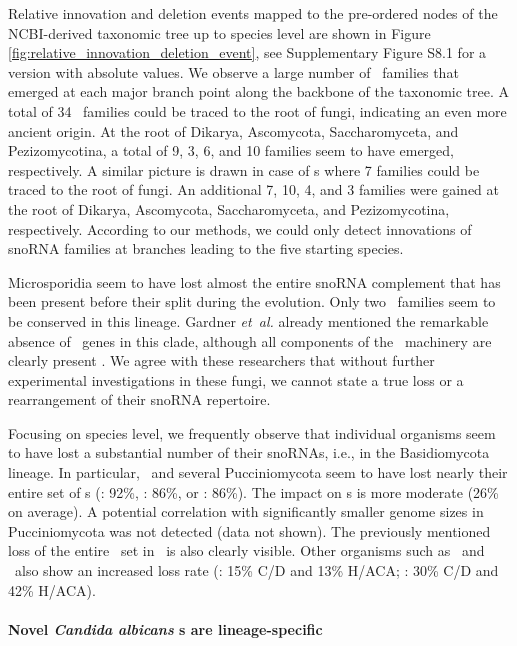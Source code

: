 Relative innovation and deletion events mapped to the pre-ordered nodes of
the NCBI-derived taxonomic tree up to species level are shown in Figure
\ref{fig:relative_innovation_deletion_event}, see Supplementary Figure S8.1
for a version with absolute values.  We observe a large number of \sno\
families that emerged at each major branch point along the backbone of the
taxonomic tree. A total of 34 \cd\ families could be traced to the root of
fungi, indicating an even more ancient origin. At the root of Dikarya,
Ascomycota, Saccharomyceta, and Pezizomycotina, a total of 9, 3, 6, and 10
families seem to have emerged, respectively. A similar picture is drawn in case of \haca s
where 7 families could be traced to the root of fungi. An additional 7, 10,
4, and 3 families were gained at the root of Dikarya, Ascomycota,
Saccharomyceta, and Pezizomycotina, respectively.  According to our
methods, we could only detect innovations of snoRNA families at branches
leading to the five starting species.

Microsporidia seem to have lost almost the entire snoRNA complement that
has been present before their split during the evolution.  Only two \cd\
families seem to be conserved in this lineage.  Gardner \emph{et~al.}
already mentioned the remarkable absence of \sno\ genes in this clade,
although all components of the \sno\ machinery are clearly present
\cite{Gardner:2010}.  We agree with these researchers that without further
experimental investigations in these fungi, we cannot state a true loss or
a rearrangement of their snoRNA repertoire.

Focusing on species level, we frequently observe that individual organisms
seem to have lost a substantial number of their snoRNAs, i.e., in the
Basidiomycota lineage.  In particular, \wse\ and several Pucciniomycota
seem to have lost nearly their entire set of \haca s (\wse: 92\%, \rmi:
86\%, or \sli: 86\%). The impact on \cd s is more moderate (26\% on
average). A potential correlation with significantly smaller genome sizes
in Pucciniomycota was not detected (data not shown). The previously
mentioned loss of the entire \haca\ set in \Ptt\ is also clearly
visible. Other organisms such as \pan\ and \opi\ also show an increased
loss rate (\pan: 15\% C/D and 13\% H/ACA; \opi: 30\% C/D and 42\% H/ACA).

\paragraph{\textbf{Novel \emph{Candida albicans} \sno s are lineage-specific}}

